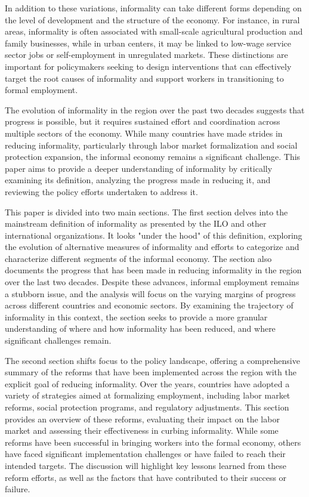 \documentclass[english]{article}
\begin{document}
In addition to these variations, informality can take different forms depending on the level of development and the structure of the economy. For instance, in rural areas, informality is often associated with small-scale agricultural production and family businesses, while in urban centers, it may be linked to low-wage service sector jobs or self-employment in unregulated markets. These distinctions are important for policymakers seeking to design interventions that can effectively target the root causes of informality and support workers in transitioning to formal employment.

The evolution of informality in the region over the past two decades suggests that progress is possible, but it requires sustained effort and coordination across multiple sectors of the economy. While many countries have made strides in reducing informality, particularly through labor market formalization and social protection expansion, the informal economy remains a significant challenge. This paper aims to provide a deeper understanding of informality by critically examining its definition, analyzing the progress made in reducing it, and reviewing the policy efforts undertaken to address it.

This paper is divided into two main sections. The first section delves into the mainstream definition of informality as presented by the ILO and other international organizations. It looks "under the hood" of this definition, exploring the evolution of alternative measures of informality and efforts to categorize and characterize different segments of the informal economy. The section also documents the progress that has been made in reducing informality in the region over the last two decades. Despite these advances, informal employment remains a stubborn issue, and the analysis will focus on the varying margins of progress across different countries and economic sectors. By examining the trajectory of informality in this context, the section seeks to provide a more granular understanding of where and how informality has been reduced, and where significant challenges remain.

The second section shifts focus to the policy landscape, offering a comprehensive summary of the reforms that have been implemented across the region with the explicit goal of reducing informality. Over the years, countries have adopted a variety of strategies aimed at formalizing employment, including labor market reforms, social protection programs, and regulatory adjustments. This section provides an overview of these reforms, evaluating their impact on the labor market and assessing their effectiveness in curbing informality. While some reforms have been successful in bringing workers into the formal economy, others have faced significant implementation challenges or have failed to reach their intended targets. The discussion will highlight key lessons learned from these reform efforts, as well as the factors that have contributed to their success or failure.
\end{document}
